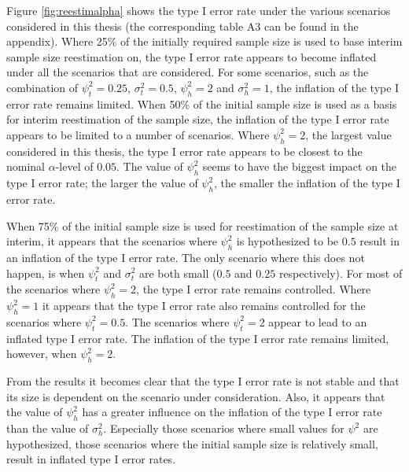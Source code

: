 \documentclass[AMA,STIX1COL,]{WileyNJD-v2}
\begin{document}
Figure \ref{fig:reestimalpha} shows the type I error rate under the various scenarios considered in this thesis (the corresponding table A3 can be found in the appendix). Where 25\% of the initially required sample size is used to base interim sample size reestimation on, the type I error rate appears to become inflated under all the scenarios that are considered. For some scenarios, such as the combination of \(\psi_t^2 = 0.25\), \(\sigma_t^2 = 0.5\), \(\psi_h^2 = 2\) and \(\sigma_h^2 = 1\), the inflation of the type I error rate remains limited. When 50\% of the initial sample size is used as a basis for interim reestimation of the sample size, the inflation of the type I error rate appears to be limited to a number of scenarios. Where \(\psi_h^2 = 2\), the largest value considered in this thesis, the type I error rate appears to be closest to the nominal \(\alpha\)-level of \(0.05\). The value of \(\psi_h^2\) seems to have the biggest impact on the type I error rate; the larger the value of \(\psi_h^2\), the smaller the inflation of the type I error rate.

When 75\% of the initial sample size is used for reestimation of the sample size at interim, it appears that the scenarios where \(\psi_h^2\) is hypothesized to be \(0.5\) result in an inflation of the type I error rate. The only scenario where this does not happen, is when \(\psi_t^2\) and \(\sigma_t^2\) are both small (\(0.5\) and \(0.25\) respectively). For most of the scenarios where \(\psi_h^2 = 2\), the type I error rate remains controlled. Where \(\psi_h^2 = 1\) it appears that the type I error rate also remains controlled for the scenarios where \(\psi_t^2 = 0.5\). The scenarios where \(\psi_t^2 = 2\) appear to lead to an inflated type I error rate. The inflation of the type I error rate remains limited, however, when \(\psi_h^2 = 2\).

From the results it becomes clear that the type I error rate is not stable and that its size is dependent on the scenario under consideration. Also, it appears that the value of \(\psi_h^2\) has a greater influence on the inflation of the type I error rate than the value of \(\sigma_h^2\). Especially those scenarios where small values for \(\psi^2\) are hypothesized, those scenarios where the initial sample size is relatively small, result in inflated type I error rates.
\end{document}

